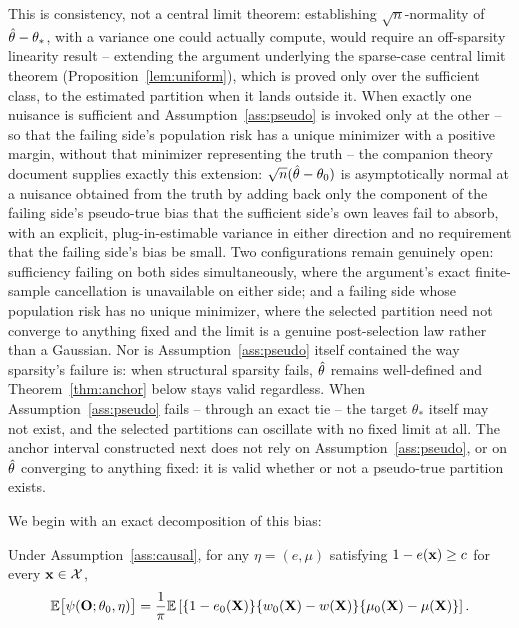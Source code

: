 \documentclass[12pt]{article}
\begin{document}
This is consistency, not a central limit theorem: establishing $\sqrt n$-normality of $\hat{\theta}-\theta_*$, with a variance one could actually compute, would require an off-sparsity linearity result -- extending the argument underlying the sparse-case central limit theorem (Proposition~\ref{lem:uniform}), which is proved only over the sufficient class, to the estimated partition when it lands outside it. When exactly one nuisance is sufficient and Assumption~\ref{ass:pseudo} is invoked only at the other -- so that the failing side's population risk has a unique minimizer with a positive margin, without that minimizer representing the truth -- the companion theory document supplies exactly this extension: $\sqrt n(\hat{\theta}-\theta_0)$ is asymptotically normal at a nuisance obtained from the truth by adding back only the component of the failing side's pseudo-true bias that the sufficient side's own leaves fail to absorb, with an explicit, plug-in-estimable variance in either direction and no requirement that the failing side's bias be small. Two configurations remain genuinely open: sufficiency failing on both sides simultaneously, where the argument's exact finite-sample cancellation is unavailable on either side; and a failing side whose population risk has no unique minimizer, where the selected partition need not converge to anything fixed and the limit is a genuine post-selection law rather than a Gaussian. Nor is Assumption~\ref{ass:pseudo} itself contained the way sparsity's failure is: when structural sparsity fails, $\hat{\theta}$ remains well-defined and Theorem~\ref{thm:anchor} below stays valid regardless. When Assumption~\ref{ass:pseudo} fails -- through an exact tie -- the target $\theta_*$ itself may not exist, and the selected partitions can oscillate with no fixed limit at all. The anchor interval constructed next does not rely on Assumption~\ref{ass:pseudo}, or on $\hat{\theta}$ converging to anything fixed: it is valid whether or not a pseudo-true partition exists.

We begin with an exact decomposition of this bias:

\begin{proposition}
\label{prop:bilinear}
Under Assumption~\ref{ass:causal}, for any
$\eta=(e,\mu)$ satisfying $1-e(\mathbf{x})\ge c$ for every $\mathbf{x}\in\mathcal{X}$,
\begin{equation}
\label{eq:bilinear}
  \mathbb{E}\bigl[\psi(\mathbf{O};\theta_0,\eta)\bigr]
  =
  \frac{1}{\pi}
  \mathbb{E}\left[
    \{1-e_0(\mathbf{X})\}
    \{w_0(\mathbf{X})-w(\mathbf{X})\}
    \{\mu_0(\mathbf{X})-\mu(\mathbf{X})\}
  \right].
\end{equation}
\end{proposition}
\end{document}
